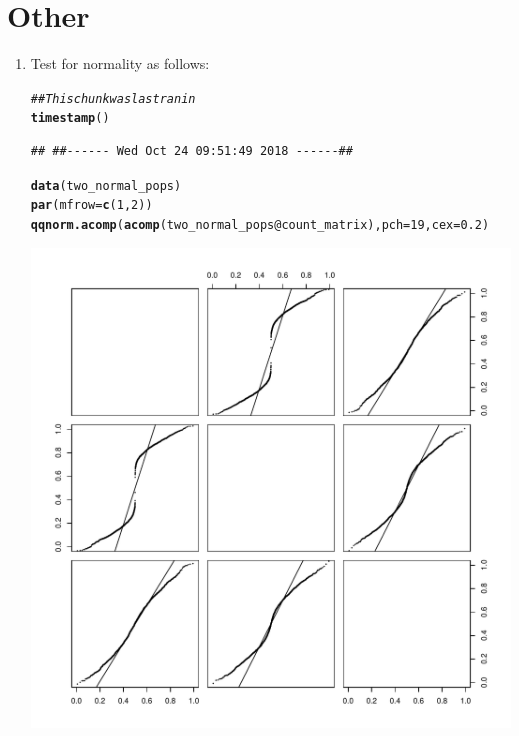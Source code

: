 \documentclass{article}\usepackage[]{graphicx}\usepackage[]{color}
\makeatletter
\def\maxwidth{ %
  \ifdim\Gin@nat@width>\linewidth
    \linewidth
  \else
    \Gin@nat@width
  \fi
}
\newcommand{\hlnum}[1]{\textcolor[rgb]{0.686,0.059,0.569}{#1}}%
\newcommand{\hlcom}[1]{\textcolor[rgb]{0.678,0.584,0.686}{\textit{#1}}}%
\newcommand{\hlopt}[1]{\textcolor[rgb]{0,0,0}{#1}}%
\newcommand{\hlstd}[1]{\textcolor[rgb]{0.345,0.345,0.345}{#1}}%
\newcommand{\hlkwc}[1]{\textcolor[rgb]{0.333,0.667,0.333}{#1}}%
\newcommand{\hlkwd}[1]{\textcolor[rgb]{0.737,0.353,0.396}{\textbf{#1}}}%
\newenvironment{kframe}{%
 \def\at@end@of@kframe{}%
 \ifinner\ifhmode%
  \def\at@end@of@kframe{\end{minipage}}%
  \begin{minipage}{\columnwidth}%
 \fi\fi%
 \def\FrameCommand##1{\hskip\@totalleftmargin \hskip-\fboxsep
 \colorbox{shadecolor}{##1}\hskip-\fboxsep
     \hskip-\linewidth \hskip-\@totalleftmargin \hskip\columnwidth}%
 \MakeFramed {\advance\hsize-\width
   \@totalleftmargin\z@ \linewidth\hsize
   \@setminipage}}%
 {\par\unskip\endMakeFramed%
 \at@end@of@kframe}
\newenvironment{knitrout}{}{} %
\makeatother
\begin{document}
\section{Other}
\begin{enumerate}
\item Test for normality as follows:
\begin{knitrout}
\color{fgcolor}\begin{kframe}
\begin{alltt}
\hlcom{## This chunk was last ran in}
\hlkwd{timestamp}\hlstd{()}
\end{alltt}
\begin{verbatim}
## ##------ Wed Oct 24 09:51:49 2018 ------##
\end{verbatim}
\begin{alltt}
\hlkwd{data}\hlstd{(two_normal_pops)}
\hlkwd{par}\hlstd{(}\hlkwc{mfrow}\hlstd{=}\hlkwd{c}\hlstd{(}\hlnum{1}\hlstd{,}\hlnum{2}\hlstd{))}
\hlkwd{qqnorm.acomp}\hlstd{(}\hlkwd{acomp}\hlstd{(two_normal_pops}\hlopt{@}\hlkwc{count_matrix}\hlstd{),} \hlkwc{pch}\hlstd{=}\hlnum{19}\hlstd{,} \hlkwc{cex}\hlstd{=}\hlnum{0.2}\hlstd{)}
\end{alltt}
\end{kframe}
\includegraphics[width=\maxwidth]{figure/unnamed-chunk-7-1} 
\begin{kframe}\begin{alltt}

\end{alltt}
\end{kframe}
\end{knitrout}
\end{enumerate}
\end{document}
